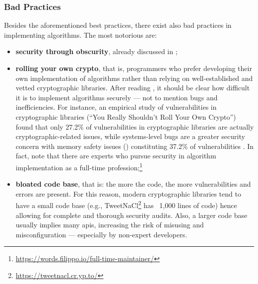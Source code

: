 \subsubsection{Bad Practices}\label{sec:security_of_cryptographic_algorithms:best_practices:bad:practices}

Besides the aforementioned best practices, there exist also bad practices in implementing algorithms. The most notorious are:

\begin{itemize}
	
	\item \textbf{security through obscurity}, already discussed in ;
		
	\item \textbf{rolling your own crypto}, that is, programmers who prefer developing their own implementation of algorithms rather than relying on well-established and vetted cryptographic libraries. After reading , it should be clear how difficult it is to implement algorithms securely --- not to mention bugs and inefficiencies. For instance, an empirical study of vulnerabilities in cryptographic libraries (``You Really Shouldn't Roll Your Own Crypto'') found that only 27.2\% of vulnerabilities in cryptographic libraries are actually cryptographic-related issues, while systems-level bugs are a greater security concern with memory safety issues () constituting 37.2\% of vulnerabilities \cite{blessing_you_2021}. In fact, note that there are experts who pursue security in algorithm implementation as a full-time profession;\footnote{\url{https://words.filippo.io/full-time-maintainer/}}
	
	\item \textbf{bloated code base}, that is: the more the code, the more vulnerabilities and errors are present. For this reason, modern cryptographic libraries tend to have a small code base (e.g., TweetNaCl\footnote{\url{https://tweetnacl.cr.yp.to/}} has ~1,000 lines of code) hence allowing for complete and thorough security audits. Also, a larger code base usually implies many \glspl{api}, increasing the risk of misusing and misconfiguration --- especially by non-expert developers.

\end{itemize}

